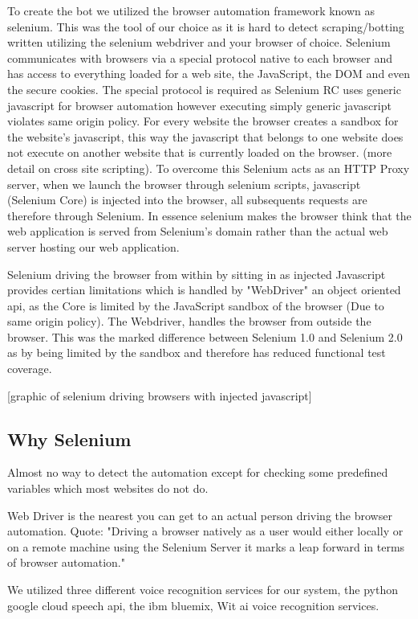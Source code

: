 To create the bot we utilized the browser automation framework known as selenium. This was the tool of our choice as it is hard to detect scraping/botting written utilizing the selenium webdriver and your browser of choice. Selenium communicates with browsers via a special protocol native to each browser and has access to everything loaded for a web site, the JavaScript, the DOM and even the secure cookies. The special protocol is required as  Selenium RC uses generic javascript for browser automation however executing simply generic javascript violates same origin policy. For every website the browser creates a sandbox for the website's javascript, this way the javascript that belongs to one website does not execute on another website that is currently loaded on the browser. (more detail on cross site scripting). To overcome this Selenium acts as an HTTP Proxy server, when we launch the browser through selenium scripts, javascript (Selenium Core) is injected into the browser, all subsequents requests are therefore through Selenium. In essence selenium makes the browser think that the web application is served from Selenium's domain rather than the actual web server hosting our web application.   

Selenium driving the browser from within by sitting in as injected Javascript provides certian limitations which is handled by "WebDriver" an object oriented api, as the Core is limited by the JavaScript sandbox of the browser (Due to same origin policy). The Webdriver, handles the browser from outside the browser. This was the marked difference between Selenium 1.0 and Selenium 2.0 as by being limited by the sandbox and therefore has reduced functional test coverage. 


[graphic of selenium driving browsers with injected javascript]


\subsection{Why Selenium}


Almost no way to detect the automation except for checking some predefined variables which most websites do not do.


Web Driver is the nearest you can get to an actual person driving the browser automation. Quote:  "Driving a browser natively as a user would either locally or on a remote machine using the Selenium Server it marks a leap forward in terms of browser automation."




We utilized three different voice recognition services for our system, the python google cloud speech api, the ibm bluemix, Wit ai voice recognition services.
